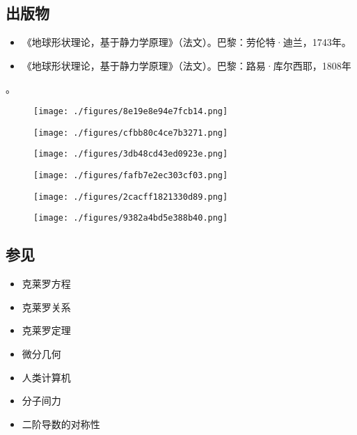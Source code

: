 \subsection{出版物}  
\begin{itemize}
\item 《地球形状理论，基于静力学原理》（法文）。巴黎：劳伦特·迪兰，1743年。  
\item 《地球形状理论，基于静力学原理》（法文）。巴黎：路易·库尔西耶，1808年
\end{itemize}。
\begin{figure}[ht]
\centering
\texttt{[image: ./figures/8e19e8e94e7fcb14.png]}
\caption{} \label{fig_Alexis_4}
\end{figure}
\begin{figure}[ht]
\centering
\texttt{[image: ./figures/cfbb80c4ce7b3271.png]}
\caption{} \label{fig_Alexis_5}
\end{figure}
\begin{figure}[ht]
\centering
\texttt{[image: ./figures/3db48cd43ed0923e.png]}
\caption{} \label{fig_Alexis_6}
\end{figure}
\begin{figure}[ht]
\centering
\texttt{[image: ./figures/fafb7e2ec303cf03.png]}
\caption{} \label{fig_Alexis_7}
\end{figure}
\begin{figure}[ht]
\centering
\texttt{[image: ./figures/2cacff1821330d89.png]}
\caption{} \label{fig_Alexis_8}
\end{figure}
\begin{figure}[ht]
\centering
\texttt{[image: ./figures/9382a4bd5e388b40.png]}
\caption{} \label{fig_Alexis_9}
\end{figure}
\subsection{参见}  
\begin{itemize}
\item 克莱罗方程  
\item 克莱罗关系  
\item 克莱罗定理  
\item 微分几何  
\item 人类计算机  
\item 分子间力  
\item 二阶导数的对称性
\end{itemize}

